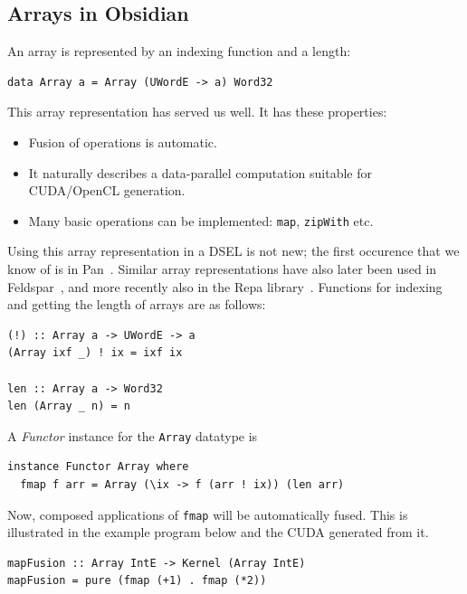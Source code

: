 \documentclass[]{sigplanconf}
\begin{document}
\subsection{Arrays in Obsidian}

An array is represented by an indexing function and a length:
\begin{codesize} 
\begin{verbatim}
data Array a = Array (UWordE -> a) Word32 
\end{verbatim}
\end{codesize}
This array representation has served us well. It has these properties:
\begin{itemize} 
\item Fusion of operations is automatic.
\item It naturally describes a data-parallel computation suitable for CUDA/OpenCL generation.
\item Many basic operations can be implemented: {\tt map}, {\tt zipWith} etc.
\end{itemize}
Using this array representation in a DSEL is not new; the first occurence that we know of is in
Pan~\cite{PAN}. Similar array representations have also later been 
used in Feldspar~\cite{FELDSPAR}, and more recently also in the Repa library~\cite{REPA}.
Functions for indexing and getting the length of arrays are as follows:
\begin{codesize} 
\begin{verbatim}
(!) :: Array a -> UWordE -> a 
(Array ixf _) ! ix = ixf ix 

len :: Array a -> Word32
len (Array _ n) = n 
\end{verbatim}
\end{codesize}
A {\em Functor} instance for the {\tt Array} datatype is
\begin{codesize} 
\begin{verbatim}
instance Functor Array where 
  fmap f arr = Array (\ix -> f (arr ! ix)) (len arr) 
\end{verbatim}
\end{codesize}
Now, composed applications of {\tt fmap} will be automatically fused. This is 
illustrated in the example program below and the CUDA generated
from it.  
\begin{codesize} 
\begin{verbatim}
mapFusion :: Array IntE -> Kernel (Array IntE) 
mapFusion = pure (fmap (+1) . fmap (*2)) 
\end{verbatim}
\end{codesize}
\end{document}

